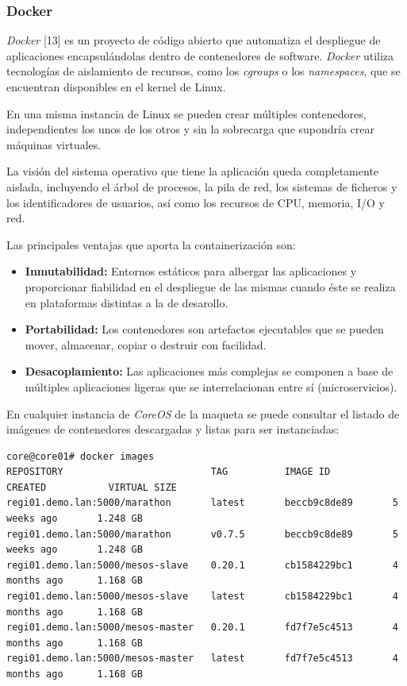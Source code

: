 \documentclass[a4paper,12pt,spanish,final]{epsc_tfc_pfc}
\begin{document}
\subsubsection{Docker}

\emph{Docker} [13] es un proyecto de código abierto que automatiza el despliegue de aplicaciones encapsulándolas dentro de contenedores de software. \emph{Docker} utiliza tecnologías de aislamiento de recursos, como los \emph{cgroups} o los \emph{namespaces}, que se encuentran disponibles en el kernel de Linux.

En una misma instancia de Linux se pueden crear múltiples contenedores, independientes los unos de los otros y sin la sobrecarga que supondría crear máquinas virtuales.

La visión del sistema operativo que tiene la aplicación queda completamente aislada, incluyendo el árbol de procesos, la pila de red, los sistemas de ficheros y los identificadores de usuarios, así como los recursos de CPU, memoria, I/O y red.

Las principales ventajas que aporta la containerización son:
\begin{itemize}
  \item \textbf{Inmutabilidad:} Entornos estáticos para albergar las aplicaciones y proporcionar fiabilidad en el despliegue de las mismas cuando éste se realiza en plataformas distintas a la de desarollo.
  \item \textbf{Portabilidad:} Los contenedores son artefactos ejecutables que se pueden mover, almacenar, copiar o destruir con facilidad.
  \item \textbf{Desacoplamiento:} Las aplicaciones más complejas se componen a base de múltiples aplicaciones ligeras que se interrelacionan entre sí (microservicios).
\end{itemize}

En cualquier instancia de \emph{CoreOS} de la maqueta se puede consultar el listado de imágenes de contenedores descargadas y listas para ser instanciadas:\\

\begin{lstlisting}[style=dnsmasq]
core@core01# docker images
REPOSITORY                          TAG          IMAGE ID           CREATED           VIRTUAL SIZE
regi01.demo.lan:5000/marathon       latest       beccb9c8de89       5 weeks ago       1.248 GB
regi01.demo.lan:5000/marathon       v0.7.5       beccb9c8de89       5 weeks ago       1.248 GB
regi01.demo.lan:5000/mesos-slave    0.20.1       cb1584229bc1       4 months ago      1.168 GB
regi01.demo.lan:5000/mesos-slave    latest       cb1584229bc1       4 months ago      1.168 GB
regi01.demo.lan:5000/mesos-master   0.20.1       fd7f7e5c4513       4 months ago      1.168 GB
regi01.demo.lan:5000/mesos-master   latest       fd7f7e5c4513       4 months ago      1.168 GB
\end{lstlisting}
\end{document}

